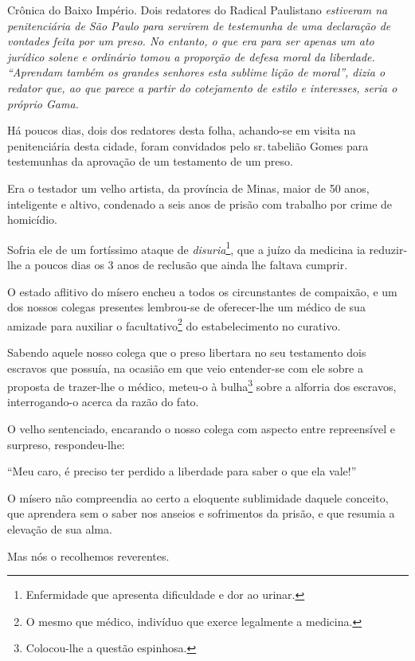 \begin{didascalia}
Crônica do Baixo Império. Dois redatores do Radical Paulistano
\emph{estiveram na penitenciária de São Paulo para servirem de
testemunha de uma declaração de vontades feita por um preso. No entanto,
o que era para ser apenas um ato jurídico solene e ordinário tomou a
proporção de defesa moral da liberdade. ``Aprendam também os grandes
senhores esta sublime lição de moral'', dizia o redator que, ao que
parece a partir do cotejamento de estilo e interesses, seria o próprio
Gama.}
\end{didascalia}



Há poucos dias, dois dos redatores desta folha, achando-se em visita na
penitenciária desta cidade, foram convidados pelo sr.\,tabelião Gomes
para testemunhas da aprovação de um testamento de um preso.

Era o testador um velho artista, da província de Minas, maior de 50
anos, inteligente e altivo, condenado a seis anos de prisão com trabalho
por crime de homicídio.

Sofria ele de um fortíssimo ataque de \emph{disuria}\footnote{
  Enfermidade que apresenta dificuldade e dor ao urinar.}, que a juízo
da medicina ia reduzir-lhe a poucos dias os 3 anos de reclusão que ainda
lhe faltava cumprir.

O estado aflitivo do mísero encheu a todos os circunstantes de
compaixão, e um dos nossos colegas presentes lembrou-se de oferecer-lhe
um médico de sua amizade para auxiliar o facultativo\footnote{O mesmo
  que médico, indivíduo que exerce legalmente a medicina.} do
estabelecimento no curativo.

Sabendo aquele nosso colega que o preso libertara no seu testamento dois
escravos que possuía, na ocasião em que veio entender-se com ele sobre a
proposta de trazer-lhe o médico, meteu-o à bulha\footnote{Colocou-lhe
  a questão espinhosa.} sobre a alforria dos escravos, interrogando-o
acerca da razão do fato.

O velho sentenciado, encarando o nosso colega com aspecto entre
repreensível e surpreso, respondeu-lhe:

``Meu caro, é preciso ter perdido a liberdade para saber o que ela vale!''

O mísero não compreendia ao certo a eloquente sublimidade daquele
conceito, que aprendera sem o saber nos anseios e sofrimentos da prisão,
e que resumia a elevação de sua alma.

Mas nós o recolhemos reverentes.

